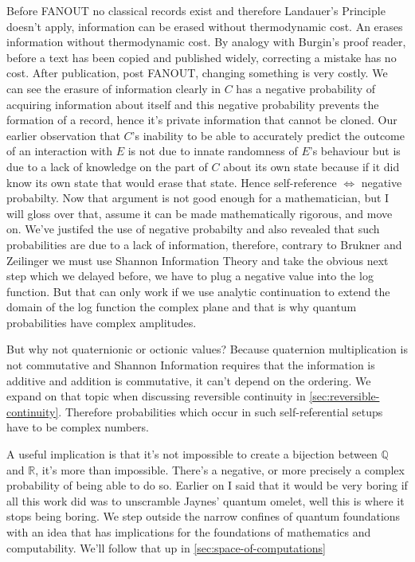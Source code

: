 Before FANOUT no classical records exist and therefore Landauer's Principle doesn't apply, information can be erased without thermodynamic cost. An  erases information without thermodynamic cost. By analogy with Burgin's proof reader, before a text has been copied and published widely, correcting a mistake has no cost. After publication, post FANOUT, changing something is very costly. We can see the erasure of information clearly in  $C$ has a negative probability of acquiring information about itself and this negative probability prevents the formation of a record, hence it's private information that cannot be cloned. Our earlier observation that $C$'s inability to be able to accurately predict the outcome of an interaction with $E$ is not due to innate randomness of $E$'s behaviour but is due to a lack of knowledge on the part of $C$ about its own state because if it did know its own state that would erase that state. Hence self-reference $\iff$ negative probabilty. 
\label{sec:complex-amplitudes}
Now that argument is not good enough for a mathematician, but I will gloss over that, assume it can be made mathematically rigorous, and move on. We've justifed the use of negative probabilty and also revealed that such probabilities are due to a lack of information, therefore, contrary to Brukner and Zeilinger \autocite{bruknerzeilinger2001shannon} we must use Shannon Information Theory and take the obvious next step which we delayed before, we have to plug a negative value into the log function. But that can only work if we use analytic continuation to extend the domain of the log function the complex plane and that is why quantum probabilities have complex amplitudes. 

But why not quaternionic or octionic values? Because quaternion multiplication is not commutative and Shannon Information requires that the information is additive and addition is commutative, it can't depend on the ordering. We expand on that topic when discussing reversible continuity in \ref{sec:reversible-continuity}. Therefore probabilities which occur in such self-referential setups have to be complex numbers. 

A useful implication is that it's not impossible to create a bijection between $\mathbb{Q}$ and $\mathbb{R}$, it's more than impossible. There's a negative, or more precisely a complex probability of being able to do so. Earlier on I said that it would be very boring if all this work did was to unscramble Jaynes' quantum omelet, well this is where it stops being boring. We step outside the narrow confines of quantum foundations with an idea that has implications for the foundations of mathematics and computability. We'll follow that up in \ref{sec:space-of-computations} 

